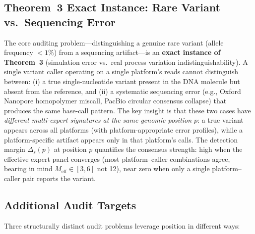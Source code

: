 \documentclass[12pt,a4paper]{article}
\begin{document}
\subsection{Theorem~3 Exact Instance: Rare Variant vs.\ Sequencing Error}

The core auditing problem---distinguishing a genuine rare variant (allele frequency $< 1\%$) from a sequencing artifact---is an \textbf{exact instance of Theorem~3} (simulation error vs.\ real process variation indistinguishability). A single variant caller operating on a single platform's reads cannot distinguish between: (i) a true single-nucleotide variant present in the DNA molecule but absent from the reference, and (ii) a systematic sequencing error (e.g., Oxford Nanopore homopolymer miscall, PacBio circular consensus collapse) that produces the same base-call pattern. The key insight is that these two cases have \textit{different multi-expert signatures at the same genomic position $p$}: a true variant appears across all platforms (with platform-appropriate error profiles), while a platform-specific artifact appears only in that platform's calls. The detection margin $\Delta_s(p)$ at position $p$ quantifies the consensus strength: high when the effective expert panel converges (most platform--caller combinations agree, bearing in mind $M_{\text{eff}} \in [3,6]$ not 12), near zero when only a single platform--caller pair reports the variant.

\subsection{Additional Audit Targets}

Three structurally distinct audit problems leverage position in different ways:
\end{document}

